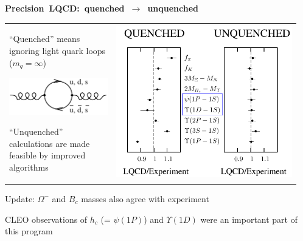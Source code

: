 \documentclass[landscape]{article}
\newenvironment{slide}[1][ ]{\mbox{\bf #1 } \vfill}{\vfill \mbox{ } \pagebreak}
\begin{document}
\begin{slide}[Precision LQCD: quenched $\to$ unquenched]

\begin{center}
  \begin{tabular}{p{0.35\linewidth} p{0.6\linewidth}}
    \begin{minipage}{\linewidth}
      \begin{center}
	``Quenched'' means ignoring light quark loops ($m_q = \infty$)

	\vspace{1 cm}
	\includegraphics[width=0.75\linewidth]{lqcd_success3}

	\vspace{1 cm}
	``Unquenched'' calculations are made feasible by improved algorithms
      \end{center}
    \end{minipage} &
    \begin{minipage}{\linewidth}
      \includegraphics[width=\linewidth]{lqcd_success2}
    \end{minipage}
  \end{tabular}
\end{center}

\vfill Update: $\Omega^-$ and $B_c$ masses also agree with experiment

\vfill CLEO observations of $h_c$ (= $\psi(1P)$) and $\Upsilon(1D)$
were an important part of this program

\end{slide}
\end{document}
